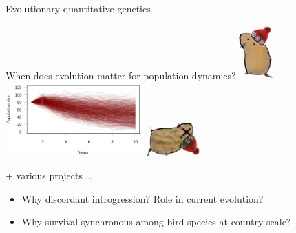 \documentclass[10pt]{beamer}%
\begin{document}
\begin{frame}{Evolutionary quantitative genetics}
    \begin{exampleblock}{When does evolution matter for population dynamics?}
    \centering 
    \includegraphics[width=0.1\textwidth]{Figures/snowwwvole2}
    \includegraphics[width=0.4\textwidth]{Figures/stochEx-1}
    \includegraphics[width=0.15\textwidth]{Figures/Deadsnowwwvole2}
    \end{exampleblock}
    
    \pause
        
    \begin{block}{\color{blue} + various projects \dots}
    \begin{itemize}
     \item Why discordant introgression? Role in current evolution?
     \item Why survival synchronous among bird species at country-scale?
    \end{itemize}
   \end{block}

    
\end{frame}
\end{document}
